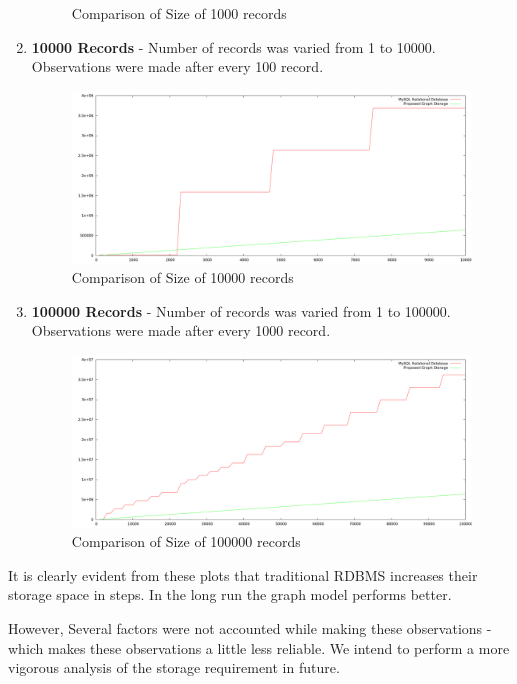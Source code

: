 \documentclass[12pt, oneside]{book}
\begin{document}
\begin{enumerate}
\begin{figure}[H]
\begin{center}
   \caption{Comparison of Size of 1000 records}
   \label{100pic}
  \end{center}
 \end{figure}
\item \textbf{10000 Records} - Number of records was varied from 1 to 10000. Observations were made after every 100 record.
 \begin{figure}[H]
  \begin{center}
   \includegraphics[width=\textwidth]{pics/10000.png}
   \caption{Comparison of Size of 10000 records}
   \label{100pic}
  \end{center}
 \end{figure}
 \item \textbf{100000 Records} - Number of records was varied from 1 to 100000. Observations were made after every 1000 record.
 \begin{figure}[H]
  \begin{center}
   \includegraphics[width=\textwidth]{pics/100000.png}
   \caption{Comparison of Size of 100000 records}
   \label{100pic}
  \end{center}
 \end{figure}
\end{enumerate}
\par
It is clearly evident from these plots that traditional RDBMS increases their storage space in steps. In the long run the graph model performs better.
\par
However, Several factors were not accounted while making these observations - which makes these observations a little less reliable. We intend to perform a more vigorous analysis of the storage requirement in future.

\pagebreak

%
%
%
%
\end{document}

